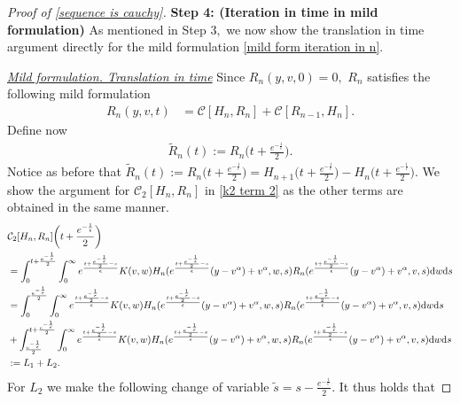 \documentclass[11pt]{article}
\numberwithin{equation}{section}
\newcommand{\der}{\textup{d}}
\begin{document}
\begin{proof}[Proof of \eqref{sequence is cauchy}]
{\bf Step 4: (Iteration in time in mild formulation)}
As mentioned in Step $3,$ we now show the translation in time argument directly for the mild formulation \eqref{mild form iteration in n}.
\vspace{0.2cm}

\textit{\underline{Mild formulation. Translation in time}}
Since $R_{n}(y,v,0)=0,$ $R_{n}$ satisfies the following mild formulation 
\begin{align*}
R_n(y,v,t)&=\mathcal{C}[H_{n},R_n]+\mathcal{C}[R_{n-1},H_{n}].
\end{align*}
Define now
\begin{align*}
 \tilde{R}_{n}(t):=R_{n}\bigg(t+\frac{e^{-\frac{1}{\epsilon}}}{2}\bigg).
    \end{align*}
    Notice as before that $\tilde{R}_{n}(t):=R_{n}\bigg(t+\frac{e^{-\frac{1}{\epsilon}}}{2}\bigg)=H_{n+1}\bigg(t+\frac{e^{-\frac{1}{\epsilon}}}{2}\bigg)-H_{n}\bigg(t+\frac{e^{-\frac{1}{\epsilon}}}{2}\bigg)$. We show the argument for  $\mathcal{C}_{2}[H_{n},R_n]$ in \eqref{k2 term 2} as the other terms are obtained in the same manner.
\begin{align*}
&\mathcal{C}_{2}[H_{n},R_n]  \bigg(t+\frac{e^{-\frac{1}{\epsilon}}}{2}\bigg)\\
&=\int_{0}^{t+\frac{e^{-\frac{1}{\epsilon}}}{2}}\int_{0}^{\infty}e^{\frac{t+\frac{e^{-\frac{1}{\epsilon}}}{2}-s}{\epsilon}}K(v,w)H_{n}(e^{\frac{t+\frac{e^{-\frac{1}{\epsilon}}}{2}-s}{\epsilon}}(y-v^{\alpha})+v^{\alpha},w,s)R_{n}(e^{\frac{t+\frac{e^{-\frac{1}{\epsilon}}}{2}-s}{\epsilon}}(y-v^{\alpha})+v^{\alpha},v,s)\der w\der s\\
&=\int_{0}^{\frac{e^{-\frac{1}{\epsilon}}}{2}}\int_{0}^{\infty}e^{\frac{t+\frac{e^{-\frac{1}{\epsilon}}}{2}-s}{\epsilon}}K(v,w)H_{n}(e^{\frac{t+\frac{e^{-\frac{1}{\epsilon}}}{2}-s}{\epsilon}}(y-v^{\alpha})+v^{\alpha},w,s)R_{n}(e^{\frac{t+\frac{e^{-\frac{1}{\epsilon}}}{2}-s}{\epsilon}}(y-v^{\alpha})+v^{\alpha},v,s)\der w\der s\\
&+\int_{\frac{e^{-\frac{1}{\epsilon}}}{2}}^{t+\frac{e^{-\frac{1}{\epsilon}}}{2}}\int_{0}^{\infty}e^{\frac{t+\frac{e^{-\frac{1}{\epsilon}}}{2}-s}{\epsilon}}K(v,w)H_{n}(e^{\frac{t+\frac{e^{-\frac{1}{\epsilon}}}{2}-s}{\epsilon}}(y-v^{\alpha})+v^{\alpha},w,s)R_{n}(e^{\frac{t+\frac{e^{-\frac{1}{\epsilon}}}{2}-s}{\epsilon}}(y-v^{\alpha})+v^{\alpha},v,s)\der w\der s\\
&:=L_{1}+L_{2}.
\end{align*}
For $L_{2}$ we make the following change of variable $\tilde{s}=s-\frac{e^{-\frac{1}{\epsilon}}}{2}$. It thus holds that

\end{proof}
\end{document}

